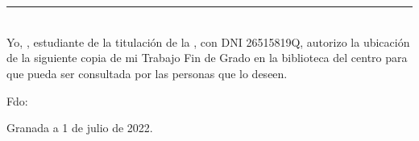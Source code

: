 \chapter*{}

\thispagestyle{empty}

\noindent\rule[-1ex]{\textwidth}{2pt}\\[4.5ex]

Yo, \textbf{\myName}, estudiante de la titulación {\myDegree} de la \textbf{\myFaculty}, con DNI 26515819Q, autorizo la ubicación de la siguiente copia de mi Trabajo Fin de Grado en la biblioteca del centro para que pueda ser consultada por las personas que lo deseen.

\vspace{6cm}

\noindent Fdo: \myName

\vspace{2cm}

\begin{flushright}
Granada a 1 de julio de 2022.
\end{flushright}

